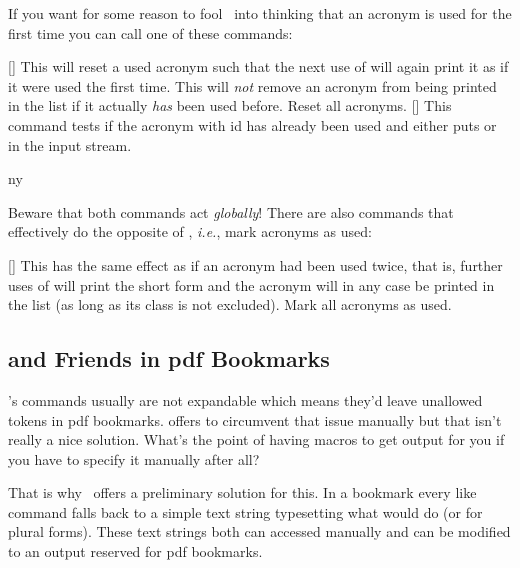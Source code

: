 \documentclass[load-preamble+,scrartcl={DIV10}]{cnltx-doc}
\newcommand*\latin{\textit}
\begin{document}
If you want for some reason to fool \acro\ into thinking that an acronym is
used for the first time you can call one of these commands:
\begin{commands}
  []
    This will reset a used acronym such that the next use of
     will again print it as if it were used the first time.  This will
    \emph{not} remove an acronym from being printed in the list if it actually
    \emph{has} been used before.
    Reset all acronyms.
  []
    This command tests if the acronym with \ac{id}
     has already been used and either puts  or
     in the input stream.
\end{commands}
\begin{example}
  \ac{ny}
\end{example}
Beware that both commands act \emph{globally}!  There are also commands that
effectively do the opposite of , \latin{i.e.}, mark acronyms as
used:
\begin{commands}
  []
    This has the same effect as if an acronym had been used
    twice, that is, further uses of  will print the short form and the 
    acronym will in any case be printed in the list (as long as its class is
    not excluded).
    Mark all acronyms as used.
\end{commands}

\subsection{ and Friends in \acs*{pdf} Bookmarks}
\noindent{}\acro's commands usually are not expandable which
means they'd leave unallowed tokens in \acs{pdf} bookmarks.  
offers  to circumvent that issue manually but that isn't
really a nice solution.  What's the point of having macros to get output for
you if you have to specify it manually after all?

That is why \acro\ offers a preliminary solution for this.  In a bookmark
every  like command falls back to a simple text string typesetting what
 would do (or  for plural forms).  These text strings both
can accessed manually and can be modified to an output reserved for \acs{pdf}
bookmarks.
\end{document}
